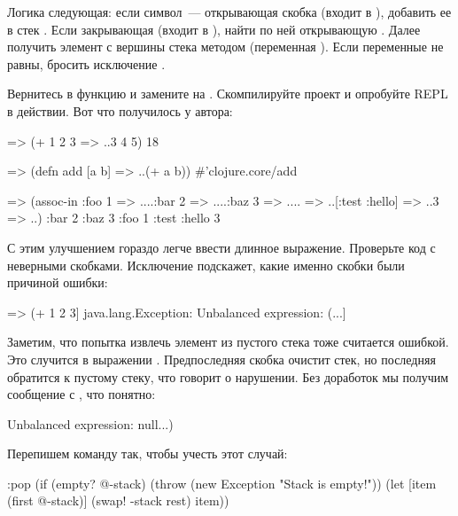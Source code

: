 Логика следующая: если символ~--- открывающая скобка (входит в ), добавить ее в стек . Если закрывающая (входит в ), найти по ней открывающую . Далее получить элемент с вершины стека методом  (переменная ). Если переменные не равны, бросить исключение .

Вернитесь в функцию  и замените  на . Скомпилируйте проект и опробуйте REPL в действии. Вот что получилось у автора:

\begin{english}
  \begin{clojure}
=> (+ 1 2 3
=> ..3 4 5)
18

=> (defn add [a b]
=> ..(+ a b))
#'clojure.core/add

=> (assoc-in {:foo 1
=> ....:bar 2
=> ....:baz 3
=> ....}
=> ..[:test :hello]
=> ..3
=> ..)
{:bar 2 :baz 3 :foo 1 :test {:hello 3}}
  \end{clojure}
\end{english}

С этим улучшением гораздо легче ввести длинное выражение. Проверьте код с неверными скобками. Исключение подскажет, какие именно скобки были причиной ошибки:

\begin{english}
  \begin{clojure}
=> (+ 1 2 3]
java.lang.Exception: Unbalanced expression: (...]
  \end{clojure}
\end{english}

Заметим, что попытка извлечь элемент из пустого стека тоже считается ошибкой. Это случится в выражении . Предпоследняя скобка очистит стек, но последняя обратится к пустому стеку, что говорит о нарушении. Без доработок мы получим сообщение с , что понятно:

\begin{english}
  \begin{clojure}
Unbalanced expression: null...)
  \end{clojure}
\end{english}

Перепишем команду  так, чтобы учесть этот случай:

\begin{english}
  \begin{clojure}
:pop (if (empty? @-stack)
       (throw (new Exception "Stack is empty!"))
       (let [item (first @-stack)]
         (swap! -stack rest)
         item))
  \end{clojure}
\end{english}

